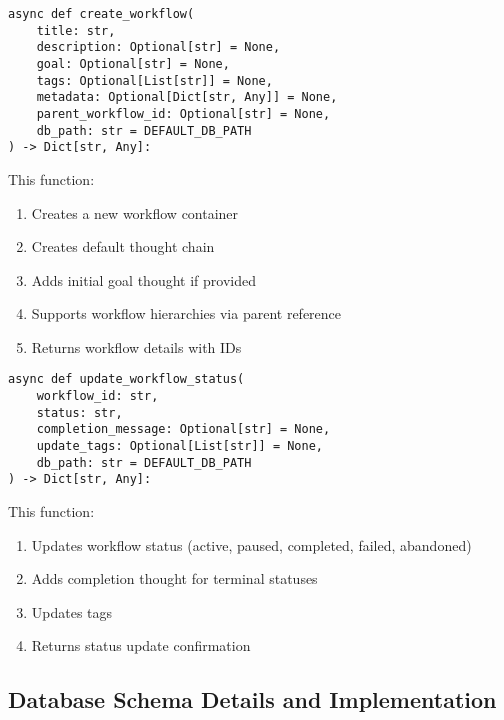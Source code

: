 \documentclass[12pt,a4paper]{article}
\begin{document}
\begin{pageablecode}
\begin{verbatim}
async def create_workflow(
    title: str,
    description: Optional[str] = None,
    goal: Optional[str] = None,
    tags: Optional[List[str]] = None,
    metadata: Optional[Dict[str, Any]] = None,
    parent_workflow_id: Optional[str] = None,
    db_path: str = DEFAULT_DB_PATH
) -> Dict[str, Any]:
\end{verbatim}
\end{pageablecode}
This function:
\begin{enumerate}[label=\arabic*.]
    \item Creates a new workflow container
    \item Creates default thought chain
    \item Adds initial goal thought if provided
    \item Supports workflow hierarchies via parent reference
    \item Returns workflow details with IDs
\end{enumerate}

\begin{pageablecode}
\begin{verbatim}
async def update_workflow_status(
    workflow_id: str,
    status: str,
    completion_message: Optional[str] = None,
    update_tags: Optional[List[str]] = None,
    db_path: str = DEFAULT_DB_PATH
) -> Dict[str, Any]:
\end{verbatim}
\end{pageablecode}
This function:
\begin{enumerate}[label=\arabic*.]
    \item Updates workflow status (active, paused, completed, failed, abandoned)
    \item Adds completion thought for terminal statuses
    \item Updates tags
    \item Returns status update confirmation
\end{enumerate}

\subsection*{Database Schema Details and Implementation}
\end{document}
